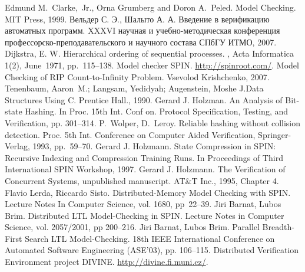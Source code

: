 \begin{thebibliography}{99}

 Edmund M.~Clarke,~Jr., Orna Grumberg and Doron A.~Peled. Model
  Checking. MIT Press, 1999.
 Вельдер С. Э., Шалыто А. А. Введение в верификацию автоматных
  программ. XXXVI научная и учебно-методическая конференция
  профессорско-преподавательского и научного состава СПбГУ ИТМО, 2007.
 Dijkstra, E. W. Hierarchical ordering of sequential processes. , Acta
  Informatica 1(2), June~1971, pp.~115--138.
 Model checker SPIN. \url{http://spinroot.com/}.
 Model Checking of RIP Count-to-Infinity Problem. Vsevolod Krishchenko,
  2007.
 Tenenbaum, Aaron~M.; Langsam, Yedidyah; Augenstein, Moshe J.Data
  Structures Using C. Prentice Hall., 1990.
 Gerard J. Holzman. An Analysis of Bit-state Hashing. In Proc. 15th
  Int. Conf on. Protocol Specification, Testing, and Verification, pp. 301--314.
 P.~Wolper, D.~Leroy. Reliable hashing without collision
  detection. Proc. 5th Int. Conference on Computer Aided Verification, Springer-Verlag,
  1993, pp.~59--70.
 Gerard J. Holzmann. State Compression in SPIN: Recursive Indexing and
  Compression Training Runs. In Proceedings of Third International SPIN Workshop, 1997.
 Gerard J. Holzmann. The Verification of Concurrent Systems, unpublished
  manuscript. AT\&T Inc., 1995, Chapter 4.
 Flavio Lerda, Riccardo Sisto. Distributed-Memory Model Checking with
  SPIN. Lecture Notes In Computer Science, vol. 1680, pp~22--39.
 Jiri Barnat, Lubos Brim. Distributed LTL Model-Checking in SPIN. Lecture
  Notes in Computer Science, vol. 2057/2001, pp 200--216.
 Jiri Barnat, Lubos Brim. Parallel Breadth-First Search LTL
  Model-Checking. 18th IEEE International Conference on Automated Software Engineering
  (ASE'03), pp. 106--115.
 Distributed Verification Environment project
  DIVINE. \url{http://divine.fi.muni.cz/}.
\end{thebibliography}

